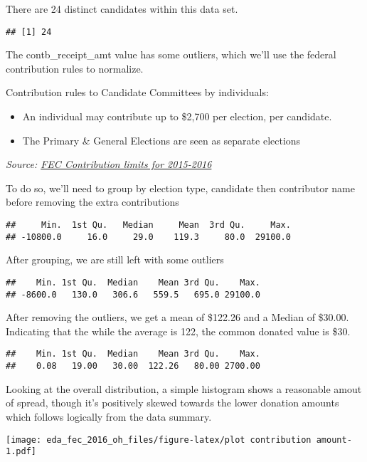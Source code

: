 \documentclass[]{article}
\providecommand{\tightlist}{%
  \setlength{\itemsep}{0pt}\setlength{\parskip}{0pt}}
\begin{document}
There are 24 distinct candidates within this data set.

\begin{verbatim}
## [1] 24
\end{verbatim}

The contb\_receipt\_amt value has some outliers, which we'll use the
federal contribution rules to normalize.

Contribution rules to Candidate Committees by individuals:

\begin{itemize}
\tightlist
\item
  An individual may contribute up to \$2,700 per election, per
  candidate.
\item
  The Primary \& General Elections are seen as separate elections
\end{itemize}

\emph{Source:
\href{https://www.fec.gov/updates/contribution-limits-for-2015-2016/}{FEC
\textbar{} Contribution limits for 2015-2016}}

To do so, we'll need to group by election type, candidate then
contributor name before removing the extra contributions

\begin{verbatim}
##     Min.  1st Qu.   Median     Mean  3rd Qu.     Max. 
## -10800.0     16.0     29.0    119.3     80.0  29100.0
\end{verbatim}

After grouping, we are still left with some outliers

\begin{verbatim}
##    Min. 1st Qu.  Median    Mean 3rd Qu.    Max. 
## -8600.0   130.0   306.6   559.5   695.0 29100.0
\end{verbatim}

After removing the outliers, we get a mean of \$122.26 and a Median of
\$30.00. Indicating that the while the average is 122, the common
donated value is \$30.

\begin{verbatim}
##    Min. 1st Qu.  Median    Mean 3rd Qu.    Max. 
##    0.08   19.00   30.00  122.26   80.00 2700.00
\end{verbatim}

Looking at the overall distribution, a simple histogram shows a
reasonable amout of spread, though it's positively skewed towards the
lower donation amounts which follows logically from the data summary.

\texttt{[image: eda\_fec\_2016\_oh\_files/figure-latex/plot contribution amount-1.pdf]}
\end{document}
